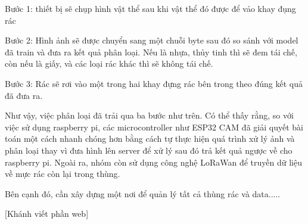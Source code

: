 Bước 1: thiết bị sẽ chụp hình vật thể sau khi vật thể đó được để vảo khay đụng rác

Bước 2: Hình ảnh sẽ được chuyển sang một chuỗi byte sau đó so sánh với model đã train và đưa ra kết quả phân loại.
Nếu là nhựa, thủy tinh thì sẽ đem tái chế, còn nếu là giấy, và các loại rác khác thì sẽ không tái chế.

Bước 3: Rác sẽ rơi vào một trong hai khay đựng rác bên trong theo đúng kết quả đã đưa ra.

Như vậy, việc phân loại đã trải qua ba bước như trên.
Có thể thấy rằng, so với việc sử dụng raspberry pi, các microcontroller như ESP32 CAM đã giải quyết bài toán một cách nhanh chóng hơn bằng cách tự thực hiện quá trình xử lý ảnh và phân loại thay vì đưa hình lên server để xử lý sau đó trả kết quả ngược về cho raspberry pi.
Ngoài ra, nhóm còn sử dụng công nghệ LoRaWan để truyền dữ liệu về mực rác còn lại trong thùng.


Bên cạnh đó, cần xây dựng một nơi để quản lý tất cả thùng rác và data.....

[Khánh viết phần web]










